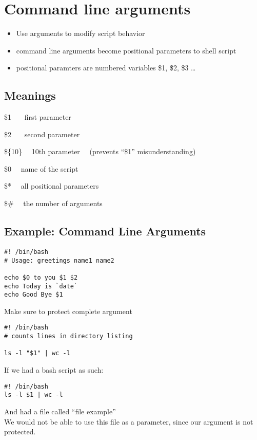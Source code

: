 \documentclass{report}
\begin{document}
\section{Command line arguments}
\begin{itemize}
  \item Use arguments to modify script behavior 
  \item command line arguments become positional parameters to shell script
  \item positional paramters are numbered variables
    \subitem \$1, \$2, \$3 \ldots
\end{itemize}
\subsection{Meanings}
\$1 \ \ \ first parameter \vspace{2mm}

\noindent \$2 \ \ \ second parameter \vspace{2mm}

\noindent     \$\{10\}  \ \ 10th parameter \ \ (prevents ``\$1'' misunderstanding) \vspace{2mm}

\noindent \$0  \ \ name of the script \vspace{2mm}

\noindent \$*  \ \ all positional parameters \vspace{2mm}

\noindent \$\#  \ \ the number of arguments
\subsection{Example: Command Line Arguments}
\begin{mdframed}
\begin{verbatim}
#! /bin/bash
# Usage: greetings name1 name2

echo $0 to you $1 $2
echo Today is `date`
echo Good Bye $1
\end{verbatim}
\end{mdframed}
Make sure to protect complete argument 
\begin{verbatim}
#! /bin/bash
# counts lines in directory listing

ls -l "$1" | wc -l
\end{verbatim}
If we had a bash script as such:
\begin{verbatim}
#! /bin/bash
ls -l $1 | wc -l
\end{verbatim}
And had a file called ``file example'' \\
We would not be able to use this file as a parameter, since our argument is not protected.
\end{document}

